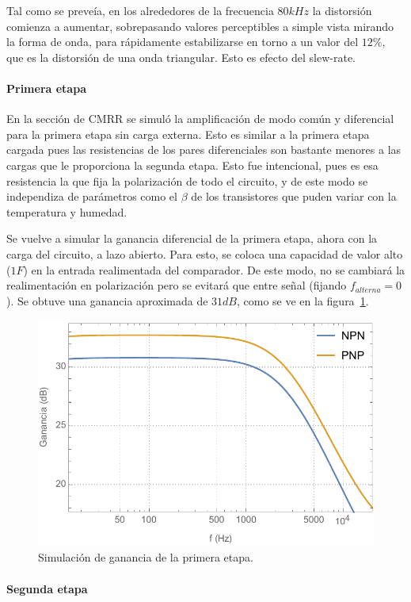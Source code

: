 \documentclass[a4paper,12pt,twoside]{article}
\begin{document}
Tal como se preveía, en los alrededores de la frecuencia $80kHz$ la distorsión comienza a aumentar, sobrepasando valores perceptibles a simple vista mirando la forma de onda, para rápidamente estabilizarse en torno a un valor del $12\%$, que es la distorsión de una onda triangular. Esto es efecto del slew-rate.


\paragraph{Primera etapa}

En la sección de CMRR se simuló la amplificación de modo común y diferencial para la primera etapa sin carga externa. Esto es similar a la primera etapa cargada pues las resistencias de los pares diferenciales son bastante menores a las cargas que le proporciona la segunda etapa. Esto fue intencional, pues es esa resistencia la que fija la polarización de todo el circuito, y de este modo se independiza de parámetros como el $\beta$ de los transistores que puden variar con la temperatura y humedad.

Se vuelve a simular la ganancia diferencial de la primera etapa, ahora con la carga del circuito, a lazo abierto. Para esto, se coloca una capacidad de valor alto ($1F$) en la entrada realimentada del comparador. De este modo, no se cambiará la realimentación en polarización pero se evitará que entre señal (fijando $f_{alterna}=0$). Se obtuve una ganancia aproximada de $31dB$, como se ve en la figura~\ref{fig:1era-etapa-bode}.


\begin{figure}[H]
	\centering
	\includegraphics[height=0.4\textwidth]{img/sim/1era-etapa-bode}
	\caption{Simulación de ganancia de la primera etapa.}
	\label{fig:1era-etapa-bode}
\end{figure}

\paragraph{Segunda etapa}
\end{document}
